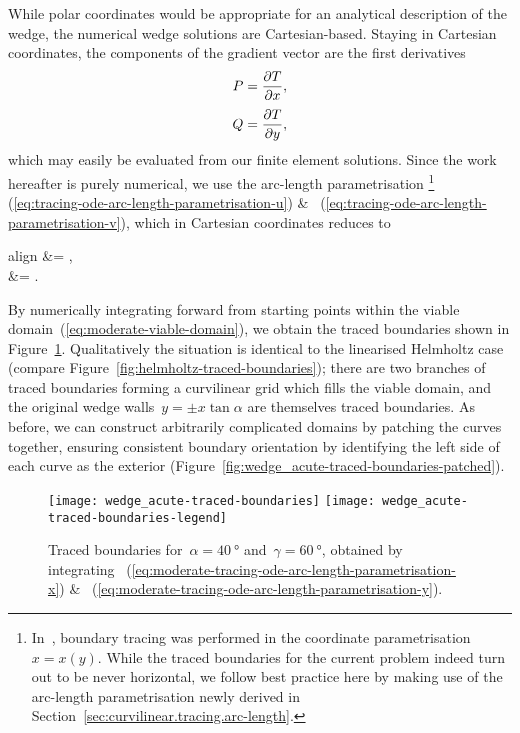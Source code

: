 While polar coordinates would be appropriate
for an analytical description of the wedge,
the numerical wedge solutions are Cartesian-based.
Staying in Cartesian coordinates,
the components of the gradient vector
are the first derivatives
\begin{align}
  P &= \pder{T}{x},
    \label{eq:moderate-gradient-x-component} \\[\tallspace]
  Q &= \pder{T}{y},
    \label{eq:moderate-gradient-y-component}
\end{align}
which may easily be evaluated from our finite element solutions.
Since the work hereafter is purely numerical,
we use the arc-length parametrisation%
\footnote{
  In~\cite{li-2017-thesis-rounding-capillary-wedge},
  boundary tracing was performed in the coordinate parametrisation~$x = x (y)$.
  While the traced boundaries for the current problem
  indeed turn out to be never horizontal,
  we follow best practice here
  by making use of the arc-length parametrisation
  newly derived in Section~\ref{sec:curvilinear.tracing.arc-length}.
}~%
  (\ref{eq:tracing-ode-arc-length-parametrisation-u})
\&~%
  (\ref{eq:tracing-ode-arc-length-parametrisation-v}),
which in Cartesian coordinates reduces to
\begin{important}{align}
   &= ,
    \label{eq:moderate-tracing-ode-arc-length-parametrisation-x} \\[\tallspace]
   &= .
    \label{eq:moderate-tracing-ode-arc-length-parametrisation-y}
\end{important}
By numerically integrating forward from starting points
within the viable domain~(\ref{eq:moderate-viable-domain}),
we obtain the traced boundaries shown
in Figure~\ref{fig:wedge_acute-traced-boundaries}.
Qualitatively the situation is identical
to the linearised Helmholtz case
(compare Figure~\ref{fig:helmholtz-traced-boundaries});
there are two branches of traced boundaries
forming a curvilinear grid which fills the viable domain,
and the original wedge walls~$y = \pm x \tan\alpha$
are themselves traced boundaries.
As before, we can construct arbitrarily complicated domains
by patching the curves together,
ensuring consistent boundary orientation
by identifying the left side of each curve as the exterior
(Figure~\ref{fig:wedge_acute-traced-boundaries-patched}).

\begin{figure}
  \newcommand*{\legendoffsetheight}{0.34\textwidth}
  \centering
  \texttt{[image: wedge\_acute-traced-boundaries]}
  \texttt{[image: wedge\_acute-traced-boundaries-legend]}
  \caption{
    Traced boundaries for~$\alpha = \SI{40}{\degree}$
    and~$\gamma = \SI{60}{\degree}$,
    obtained by integrating~%
      (\ref{eq:moderate-tracing-ode-arc-length-parametrisation-x})
    \&~%
      (\ref{eq:moderate-tracing-ode-arc-length-parametrisation-y}).
  }
  \label{fig:wedge_acute-traced-boundaries}
\end{figure}

